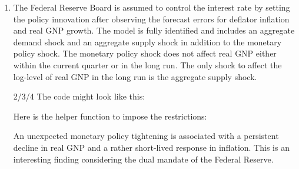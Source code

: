 \begin{enumerate}
\item The Federal Reserve Board is assumed to control the interest rate by setting the policy innovation
  after observing the forecast errors for deflator inflation and real GNP growth.
The model is fully identified and includes an aggregate demand shock and an aggregate supply shock in addition to the monetary policy shock.
The monetary policy shock does not affect real GNP either within the current quarter or in the long run.
The only shock to affect the log-level of real GNP in the long run is the aggregate supply shock.

\item[2/3/4] The code might look like this:

Here is the helper function to impose the restrictions:

An unexpected monetary policy tightening is associated with a persistent decline in real GNP and a rather short-lived response in inflation.
This is an interesting finding considering the dual mandate of the Federal Reserve.
\end{enumerate}